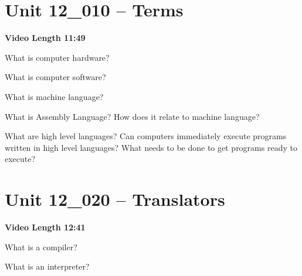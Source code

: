 \documentclass[letterpaper,12pt]{exam}
\newcommand{\unit}{Unit 12}
\begin{document}
\section*{\unit\_010 -- Terms} 
\par{\selectfont\textbf{Video Length 11:49}}
\begin{questions}
\begin{samepage}
    \question What is computer hardware?
    \vspace{5mm}
\end{samepage}
\begin{samepage}
    \question What is computer software?
    \vspace{5mm}
\end{samepage}

\begin{samepage}
    \question What is machine language?
    \vspace{5mm}
\end{samepage}

\begin{samepage}
    \question What is Assembly Language?  How does it relate to machine language?
    \vspace{5mm}
\end{samepage}

\begin{samepage}
    \question What are high level languages?  Can computers immediately execute programs written in high level languages?  What needs to be done to get programs ready to execute?
    \vspace{5mm}
\end{samepage}

\section*{\unit\_020 -- Translators} 
\par{\selectfont\textbf{Video Length 12:41}}

\begin{samepage}
    \question What is a compiler?
    \vspace{5mm}
\end{samepage}

\begin{samepage}
    \question What is an interpreter?
    \vspace{5mm}
\end{samepage}


\end{questions}
\end{document}
